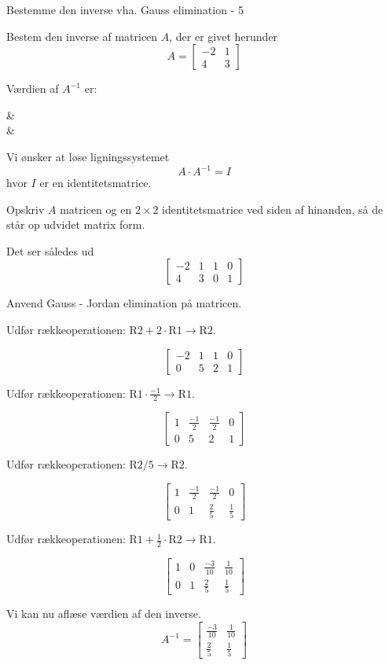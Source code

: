 \documentclass{article}
\begin{document}
\begin{exercise}{Bestemme den inverse vha. Gauss elimination - 5}

Bestem den inverse af matricen $A$, der er givet herunder
\[
A = \left[\begin{array}{cc}
-2 & 1 \\
4 & 3
\end{array} \right]
\]

Værdien af $A^{-1}$ er:
\begin{answermatrix}
 &  \\
 & 
\end{answermatrix}

\hint
Vi ønsker at løse ligningssystemet
\[
A \cdot A^{-1} = I
\]
hvor $I$ er en identitetsmatrice.

\hint
Opskriv $A$ matricen og en $2 \times 2$ identitetsmatrice
ved siden af hinanden, så de står op udvidet matrix form.

\hint
Det ser således ud
\[
\left[\begin{array}{cc|cc}
-2 & 1 & 1 & 0 \\
4 & 3 & 0 & 1
\end{array} \right]
\]

\hint
Anvend Gauss - Jordan elimination på matricen.

\hint
Udfør rækkeoperationen: $\text{R2} + 2 \cdot \text{R1} \to \text{R2}$.

\hint
\[
\left[\begin{array}{cc|cc}
-2 & 1 & 1 & 0 \\
0 & 5 & 2 & 1
\end{array} \right]
\]

\hint
Udfør rækkeoperationen: $\text{R1} \cdot \frac{-1}{2} \to \text{R1}$.

\hint
\[
\left[\begin{array}{cc|cc}
1 & \frac{-1}{2} & \frac{-1}{2} & 0 \\
0 & 5 & 2 & 1
\end{array} \right]
\]

\hint
Udfør rækkeoperationen: $\text{R2} / 5 \to \text{R2}$.

\hint
\[
\left[\begin{array}{cc|cc}
1 & \frac{-1}{2} & \frac{-1}{2} & 0 \\
0 & 1 & \frac{2}{5} & \frac{1}{5}
\end{array} \right]
\]

\hint
Udfør rækkeoperationen: $\text{R1} + \frac{1}{2} \cdot \text{R2} \to \text{R1}$.

\hint
\[
\left[\begin{array}{cc|cc}
1 & 0 & \frac{-3}{10} & \frac{1}{10} \\
0 & 1 & \frac{2}{5} & \frac{1}{5}
\end{array} \right]
\]

\hint
Vi kan nu aflæse værdien af den inverse.
\[
A^{-1} = \left[\begin{array}{cc}
\frac{-3}{10} & \frac{1}{10} \\
\frac{2}{5} & \frac{1}{5}
\end{array} \right]
\]


\end{exercise}
\end{document}
